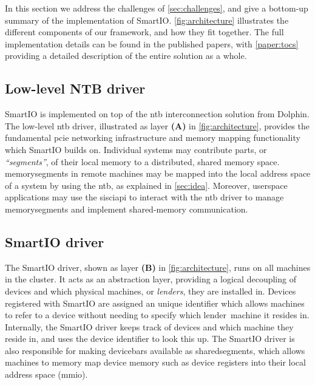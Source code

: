 In this section we address the challenges of \cref{sec:challenges}, and give a bottom-up summary of the implementation of SmartIO.
%
\cref{fig:architecture} illustrates the different components of our framework, and how they fit together.
%
The full implementation details can be found in the published papers, with \cref{paper:tocs} providing a detailed description of the entire solution as a whole.



\subsection{Low-level NTB driver}\label{sec:ntb-driver}
SmartIO is implemented on top of the \gls{ntb} interconnection solution from Dolphin.
%
The low-level \gls{ntb} driver, illustrated as layer \textbf{(A)} in \cref{fig:architecture}, provides the fundamental \gls{pcie} networking infrastructure and memory mapping functionality which SmartIO builds on.
%
Individual systems may contribute parts, or \emph{``\glspl{segment}''}, of their local memory to a distributed, shared memory space. 
%
\Glspl{memorysegment} in remote machines may be mapped into the local address space of a system by using the \gls{ntb}, as explained in \cref{sec:idea}.
%
Moreover, \gls{userspace} applications may use the \gls{sisciapi} to interact with the \gls{ntb} driver to manage \glspl{memorysegment} and implement shared-memory communication.



\subsection{SmartIO driver}\label{sec:smartio-driver}
The SmartIO driver, shown as layer \textbf{(B)} in \cref{fig:architecture}, runs on all machines in the cluster.
%
It acts as an abstraction layer, providing a logical decoupling of devices and which physical machines, or \emph{lenders}, they are installed in.
%
Devices registered with SmartIO are assigned an unique identifier which allows machines to refer to a device without needing to specify which \gls{lender}~machine it resides in.
%
Internally, the SmartIO driver keeps track of devices and which machine they reside in, and uses the device identifier to look this up.
%
The SmartIO driver is also responsible for making \glspl{devicebar} available as \glspl{sharedsegment}, which allows machines to memory map device memory such as device registers into their local address space (\gls{mmio}).



